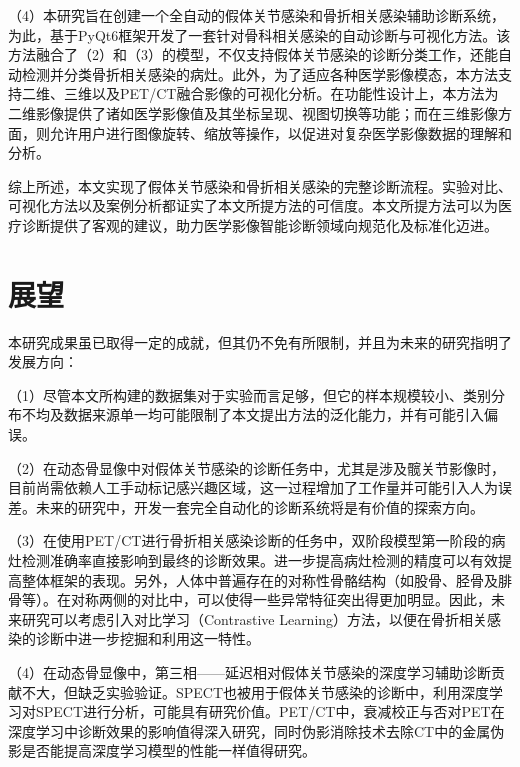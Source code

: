 （4）本研究旨在创建一个全自动的假体关节感染和骨折相关感染辅助诊断系统，为此，基于PyQt6框架开发了一套针对骨科相关感染的自动诊断与可视化方法。该方法融合了（2）和（3）的模型，不仅支持假体关节感染的诊断分类工作，还能自动检测并分类骨折相关感染的病灶。此外，为了适应各种医学影像模态，本方法支持二维、三维以及PET/CT融合影像的可视化分析。在功能性设计上，本方法为二维影像提供了诸如医学影像值及其坐标呈现、视图切换等功能；而在三维影像方面，则允许用户进行图像旋转、缩放等操作，以促进对复杂医学影像数据的理解和分析。

综上所述，本文实现了假体关节感染和骨折相关感染的完整诊断流程。实验对比、可视化方法以及案例分析都证实了本文所提方法的可信度。本文所提方法可以为医疗诊断提供了客观的建议，助力医学影像智能诊断领域向规范化及标准化迈进。

\section{展望}

本研究成果虽已取得一定的成就，但其仍不免有所限制，并且为未来的研究指明了发展方向：

（1）尽管本文所构建的数据集对于实验而言足够，但它的样本规模较小、类别分布不均及数据来源单一均可能限制了本文提出方法的泛化能力，并有可能引入偏误。

（2）在动态骨显像中对假体关节感染的诊断任务中，尤其是涉及髋关节影像时，目前尚需依赖人工手动标记感兴趣区域，这一过程增加了工作量并可能引入人为误差。未来的研究中，开发一套完全自动化的诊断系统将是有价值的探索方向。

（3）在使用PET/CT进行骨折相关感染诊断的任务中，双阶段模型第一阶段的病灶检测准确率直接影响到最终的诊断效果。进一步提高病灶检测的精度可以有效提高整体框架的表现。另外，人体中普遍存在的对称性骨骼结构（如股骨、胫骨及腓骨等）。在对称两侧的对比中，可以使得一些异常特征突出得更加明显。因此，未来研究可以考虑引入对比学习（Contrastive Learning）方法，以便在骨折相关感染的诊断中进一步挖掘和利用这一特性。

（4）在动态骨显像中，第三相——延迟相对假体关节感染的深度学习辅助诊断贡献不大，但缺乏实验验证。SPECT也被用于假体关节感染的诊断中，利用深度学习对SPECT进行分析，可能具有研究价值。PET/CT中，衰减校正与否对PET在深度学习中诊断效果的影响值得深入研究，同时伪影消除技术去除CT中的金属伪影是否能提高深度学习模型的性能一样值得研究。